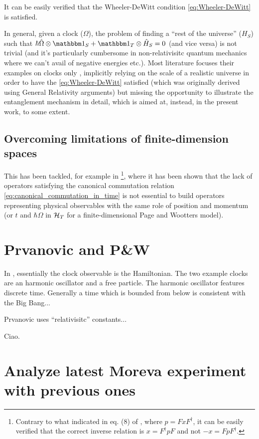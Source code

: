 It can be easily verified that the Wheeler-DeWitt condition
\eqref{eq:Wheeler-DeWitt} is satisfied.

In general, given a clock ($\Omega$), the problem of finding a
``rest of the universe'' ($H_S$) such that
$\hbar\hat{\Omega}\ox\idop_S + \idop_T\ox\hat{H}_S = 0$
(and vice versa)
is not trivial
(and it's particularly cumbersome in non-relativisitc
quantum mechanics where we can't avail of negative energies etc.).
Most literature focuses their examples on clocks only \parencite{Prvanovic,RealisticClocks,HarmonicClocks},
implicitly relying on the scale of a realistic universe
in order to have the \eqref{eq:Wheeler-DeWitt} satisfied
(which was originally derived using General Relativity arguments)
but missing the opportunity to illustrate the entanglement mechanism in detail,
which is aimed at, instead, in the present work, to some extent.

\subsection{Overcoming limitations of finite-dimension spaces}
This has been tackled, for example in 
\cite{FiniteHilb}\footnote{
  Contrary to what indicated in eq. (8) of \cite{FiniteHilb},
  where $ p = F x F^{\dagger} $,
  it can be easily verified that the correct inverse relation is
  $ x = F^{\dagger} p F$ and not $ -x = F p F^{\dagger} $.
},
where it has been shown that the lack of operators satisfying the canonical
commutation relation \eqref{eq:canonical_commutation_in_time}
is not essential to build operators representing physical observables
with the same role of position and momentum (or $t$ and $\hbar\Omega$
in $\mathcal{H}_T$ for a finite-dimensional Page and Wootters model).



\iftodo


\section{Prvanovic and P\&W}
In \cite{Prvanovic}, essentially the clock observable is the Hamiltonian.
The two example clocks are an harmonic oscillator and a free particle.
The harmonic oscillator features discrete time. Generally a time which is
{bounded from below}
is consistent with the Big Bang...

Prvanovic uses ``relativisitc'' constants...

Ciao.

\section{Analyze latest Moreva experiment with previous ones}

